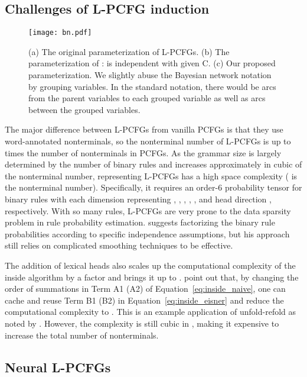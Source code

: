 \documentclass[11pt,a4paper]{article}
\begin{document}
\subsection{Challenges of L-PCFG induction}
\begin{figure*}[tb]
	\centering
	\texttt{[image: bn.pdf]}
	\caption{(a) The original parameterization of L-PCFGs. (b) The parameterization of \citet{zhu-etal-2020-return}:  is independent with  given C. (c) Our proposed parameterization. 
	We slightly abuse the Bayesian network notation by grouping variables. In the standard notation, there would be arcs from the parent variables to each grouped variable as well as arcs between the grouped variables.}
	\label{fig:bayesnet}
\end{figure*}

The major difference between L-PCFGs from vanilla PCFGs is that they use word-annotated nonterminals,
so the nonterminal number of L-PCFGs is up to  times the number of nonterminals in PCFGs.
As the grammar size is largely determined by the number of binary rules 
and increases approximately in cubic of the nonterminal number,
representing L-PCFGs has a high space complexity  ( is the nonterminal number).
Specifically, it requires an order-6 probability tensor for binary rules with each dimension representing , , , , , and head direction , respectively.
With so many rules,
L-PCFGs are very prone to the data sparsity problem in rule probability estimation. \citet{collins-2003-head} suggests factorizing the binary rule probabilities according to specific independence assumptions,
but his approach still relies on complicated smoothing techniques to be effective. 



The addition of lexical heads also scales up the computational complexity of the inside algorithm by a factor  and brings it up to .
\citet{eisner-satta-1999-efficient} point out that,
by changing the order of summations in Term A1 (A2) of Equation~\ref{eq:inside_naive},
one can cache and reuse Term B1 (B2) in Equation~\ref{eq:inside_eisner} and reduce the computational complexity to . This is an example application of unfold-refold as noted by \citet{ eisner-blatz-2007}. 
However, the complexity is still cubic in , making it expensive to increase the total number of nonterminals.




\subsection{Neural L-PCFGs}
\end{document}
